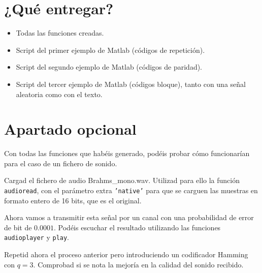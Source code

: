 \documentclass[es,practica]{uah}
\begin{document}
\section{¿Qué entregar?}
\begin{itemize}
	\item Todas las funciones creadas.
	\item Script del primer ejemplo de Matlab (códigos de repetición).
	\item Script del segundo ejemplo de Matlab (códigos de paridad).
	\item Script del tercer ejemplo de Matlab (códigos bloque), tanto con una señal aleatoria como con el texto.
\end{itemize}

\section{Apartado opcional}

Con todas las funciones que habéis generado, podéis probar cómo funcionarían para el caso de un fichero de sonido. 

Cargad el fichero de audio Brahms\_mono.wav. Utilizad para ello la función \texttt{audioread}, con el parámetro extra \texttt{'native'} para que se carguen las muestras en formato entero de 16 bits, que es el original.

Ahora vamos a transmitir esta señal por un canal con una probabilidad de error de bit de $0.0001$. Podéis escuchar el resultado utilizando las funciones \texttt{audioplayer} y \texttt{play}. 

Repetid ahora el proceso anterior pero introduciendo un codificador Hamming con $q=3$. Comprobad si se nota la mejoría en la calidad del sonido recibido. 


\end{document}
